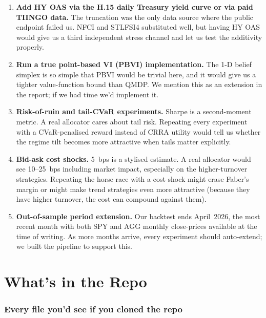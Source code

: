 \documentclass[11pt]{article}
\begin{document}
\begin{enumerate}
  \item \textbf{Add HY OAS via the H.15 daily Treasury yield curve or via paid TIINGO data.} The truncation was the only data source where the public endpoint failed us. NFCI and STLFSI4 substituted well, but having HY OAS would give us a third independent stress channel and let us test the additivity properly.

  \item \textbf{Run a true point-based VI (PBVI) implementation.} The 1-D belief simplex is so simple that PBVI would be trivial here, and it would give us a tighter value-function bound than QMDP. We mention this as an extension in the report; if we had time we'd implement it.

  \item \textbf{Risk-of-ruin and tail-CVaR experiments.} Sharpe is a second-moment metric. A real allocator cares about tail risk. Repeating every experiment with a CVaR-penalised reward instead of CRRA utility would tell us whether the regime tilt becomes more attractive when tails matter explicitly.

  \item \textbf{Bid-ask cost shocks.} 5~bps is a stylised estimate. A real allocator would see 10--25~bps including market impact, especially on the higher-turnover strategies. Repeating the horse race with a cost shock might erase Faber's margin or might make trend strategies even more attractive (because they have higher turnover, the cost can compound against them).

  \item \textbf{Out-of-sample period extension.} Our backtest ends April~2026, the most recent month with both SPY and AGG monthly close-prices available at the time of writing. As more months arrive, every experiment should auto-extend; we built the pipeline to support this.
\end{enumerate}

\part{What's in the Repo}

\section{Every file you'd see if you cloned the repo}
\end{document}
